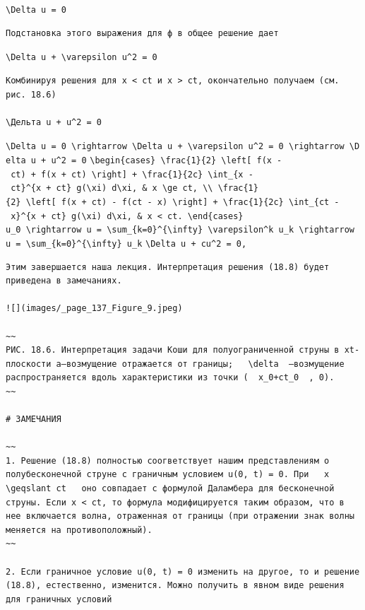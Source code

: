 \documentclass[
  ukrainian,
]{article}
\begin{document}
\texttt{\textbackslash{}Delta\ u\ =\ 0}

\begin{verbatim}
Подстановка этого выражения для ф в общее решение дает
\end{verbatim}

\texttt{\textbackslash{}Delta\ u\ +\ \textbackslash{}varepsilon\ u\^{}2\ =\ 0}

\begin{verbatim}
Комбинируя решения для x < ct и x > ct, окончательно получаем (см. рис. 18.6)

\Дельта u + u^2 = 0
\end{verbatim}

\texttt{\textbackslash{}Delta\ u\ =\ 0\ \textbackslash{}rightarrow\ \textbackslash{}Delta\ u\ +\ \textbackslash{}varepsilon\ u\^{}2\ =\ 0\ \textbackslash{}rightarrow\ \textbackslash{}Delta\ u\ +\ u\^{}2\ =\ 0}
\texttt{\textbackslash{}begin\{cases\}\ \textbackslash{}frac\{1\}\{2\}\ \textbackslash{}left{[}\ f(x\ -\ ct)\ +\ f(x\ +\ ct)\ \textbackslash{}right{]}\ +\ \textbackslash{}frac\{1\}\{2c\}\ \textbackslash{}int\_\{x\ -\ ct\}\^{}\{x\ +\ ct\}\ g(\textbackslash{}xi)\ d\textbackslash{}xi,\ \&\ x\ \textbackslash{}ge\ ct,\ \textbackslash{}\textbackslash{}\ \textbackslash{}frac\{1\}\{2\}\ \textbackslash{}left{[}\ f(x\ +\ ct)\ -\ f(ct\ -\ x)\ \textbackslash{}right{]}\ +\ \textbackslash{}frac\{1\}\{2c\}\ \textbackslash{}int\_\{ct\ -\ x\}\^{}\{x\ +\ ct\}\ g(\textbackslash{}xi)\ d\textbackslash{}xi,\ \&\ x\ \textless{}\ ct.\ \textbackslash{}end\{cases\}}
\texttt{u\_0\ \textbackslash{}rightarrow\ u\ =\ \textbackslash{}sum\_\{k=0\}\^{}\{\textbackslash{}infty\}\ \textbackslash{}varepsilon\^{}k\ u\_k\ \textbackslash{}rightarrow\ u\ =\ \textbackslash{}sum\_\{k=0\}\^{}\{\textbackslash{}infty\}\ u\_k}
\texttt{\textbackslash{}Delta\ u\ +\ cu\^{}2\ =\ 0,}

\begin{verbatim}
Этим завершается наша лекция. Интерпретация решения (18.8) будет приведена в замечаниях.

![](images/_page_137_Figure_9.jpeg)

~~
РИС. 18.6. Интерпретация задачи Коши для полуограниченной струны в xt-плоскости a—возмущение отражается от границы;   \delta  —возмущение распространяется вдоль характеристики из точки (  x_0+ct_0  , 0).
~~

# ЗАМЕЧАНИЯ

~~
1. Решение (18.8) полностью соогветствует нашим представлениям о полубесконечной струне с граничным условием u(0, t) = 0. При   x \geqslant ct   оно совпадает с формулой Даламбера для бесконечной струны. Если x < ct, то формула модифицируется таким образом, что в нее включается волна, отраженная от границы (при отражении знак волны меняется на противоположный).
~~

2. Если граничное условие u(0, t) = 0 изменить на другое, то и решение (18.8), естественно, изменится. Можно получить в явном виде решения для граничных условий
\end{verbatim}
\end{document}
